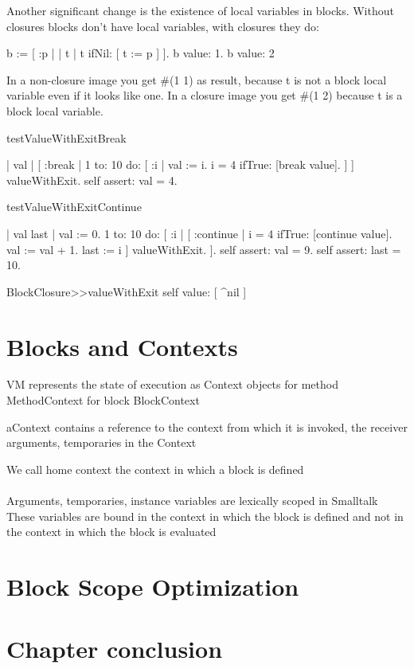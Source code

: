 \documentclass[a4paper,10pt,twoside]{book}
\begin{document}
Another significant change is the existence of local variables in blocks. 
Without closures blocks don't have local variables, with closures they do: 

\begin{code}{}
b := [ :p |
	| t |
	t ifNil: [ t := p ] ].
{ b value: 1. b value: 2 }
\end{code}

In a non-closure image you get \#(1 1) as result, because t is not a block 
local variable even if it looks like one. In a closure image you get \#(1 2)
because t is a block local variable. 

\begin{code}{}
testValueWithExitBreak

	| val |	
	[ :break |
	    1 to: 10 do: [ :i |
			val := i.
			i = 4 ifTrue: [break value].
		] 
	] valueWithExit.
	self assert: val = 4.



testValueWithExitContinue

	| val last |	
	val := 0. 
	1 to: 10 do: [ :i |
		[ :continue |
			i = 4 ifTrue: [continue value].
			val := val + 1.
			last := i
		] valueWithExit.
	].
	self assert: val = 9.
	self assert: last = 10.	

BlockClosure>>valueWithExit 
	  self value: [ ^nil ]
\end{code}


\section{Blocks and Contexts}


VM represents the state of execution as Context objects
for method MethodContext
for block BlockContext

aContext contains a reference to the context from which it is invoked, the receiver arguments, temporaries in the Context

We call home context the context in which a block is defined


\paragraph{}
Arguments, temporaries, instance variables are lexically scoped in Smalltalk
These variables are bound in the context in which the block is defined and not in the context in which the block is evaluated




\section{Block Scope Optimization}


\section{Chapter conclusion}

\ifx\wholebook\relax\else
   
   
\end{document}

